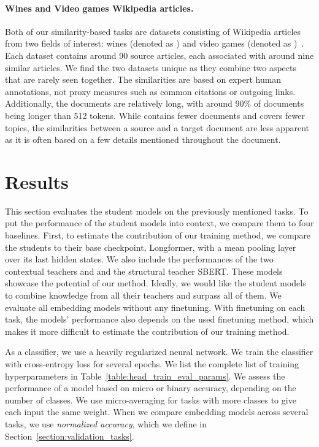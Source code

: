 \paragraph{Wines and Video games Wikipedia articles.} Both of our
similarity-based tasks are datasets consisting of Wikipedia articles from two
fields of interest: wines (denoted as ) and video games (denoted
as )~\citep{ginzburg2021self}. Each dataset contains around 90
source articles, each associated with around nine similar articles. We find the two
datasets unique as they combine two aspects that are rarely seen together. The
similarities are based on expert human annotations, not proxy measures
such as common citations or outgoing links. Additionally, the documents are
relatively long, with around 90\% of documents being longer than 512 tokens.
While  contains fewer documents and covers fewer topics, the
similarities between a source and a target document are less apparent as it is
often based on a few details mentioned throughout the document.

\section{Results}\label{section:eval_results}

This section evaluates the student models on the previously mentioned tasks. To
put the performance of the student models into context, we compare them to four
baselines. First, to estimate the contribution of our training method, we
compare the students to their base checkpoint, Longformer, with a mean pooling
layer over its last hidden states. We also include the performances of the two
contextual teachers  and  and the structural teacher SBERT.
These models showcase the potential of our method. Ideally, we would like the
student models to combine knowledge from all their teachers and surpass all of
them. We evaluate all embedding models without any finetuning. With finetuning
on each task, the models' performance also depends on the used finetuning
method, which makes it more difficult to estimate the contribution of our
training method.

As a classifier, we use a heavily regularized neural network. We train the
classifier with cross-entropy loss for several epochs. We list the complete
list of training hyperparameters in Table~\ref{table:head_train_eval_params}.
We assess the performance of a model based on micro or binary accuracy,
depending on the number of classes. We use micro-averaging for tasks with more
classes to give each input the same weight. When we compare embedding models
across several tasks, we use \emph{normalized accuracy}, which we define in
Section~\ref{section:validation_tasks}.

